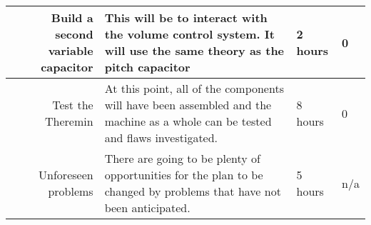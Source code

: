\documentclass[english]{article}
\begin{document}
\begin{tabularx}{\textwidth}{|R|X|l|l|}
Build a second variable capacitor & This will be to interact with the volume control system. It will use the same theory as the pitch capacitor & 2 hours & 0\\ \hline 
 
Test the Theremin & At this point, all of the components will have been assembled and the machine as a whole can be tested and flaws investigated. & 8 hours & 0\\ \hline
 
Unforeseen problems & There are going to be plenty of opportunities for the plan to be changed by problems that have not been anticipated. & 5 hours & n/a\\ \hline 
\end{tabularx}
\end{document}

